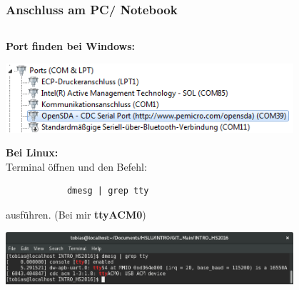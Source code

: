 \begin{frame}[fragile]
  \frametitle{Anschluss am PC/ Notebook}
	    \begin{column}{1\linewidth}
	    	\textbf{Port finden bei Windows:}\\
	    	\begin{center}
	    		\includegraphics[width=0.8\textwidth]{images/COM_Windows.png}
	    	\end{center}
	    	\textbf{Bei Linux:}\\
	    	Terminal öffnen und den Befehl: 
			\begin{verbatim}
			dmesg | grep tty
			\end{verbatim}
	    	ausführen. (Bei mir \textbf{ttyACM0})
	    	\begin{center}
	    		\includegraphics[width=0.8\textwidth]{images/Console_Result_dmesc.png}
	    	\end{center}
	    \end{column}
\end{frame}